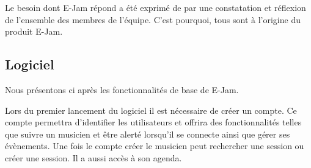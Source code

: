 \documentclass[a4,12pt]{article}
\begin{document}
Le besoin dont E-Jam répond a été exprimé de par une constatation et réflexion de
l'ensemble des membres de l'équipe. C'est pourquoi, tous sont à l'origine du produit E-Jam.


\subsection{Logiciel}

Nous présentons ci après les fonctionnalités de base de E-Jam.

Lors du premier lancement du logiciel il est nécessaire de créer un compte. Ce compte permettra d’identifier les utilisateurs et offrira des fonctionnalités telles que suivre un musicien et être alerté lorsqu’il se connecte ainsi que gérer ses évènements.
Une fois le compte créer le musicien peut rechercher une session ou créer une session. Il a aussi accès à son agenda.
\end{document}
